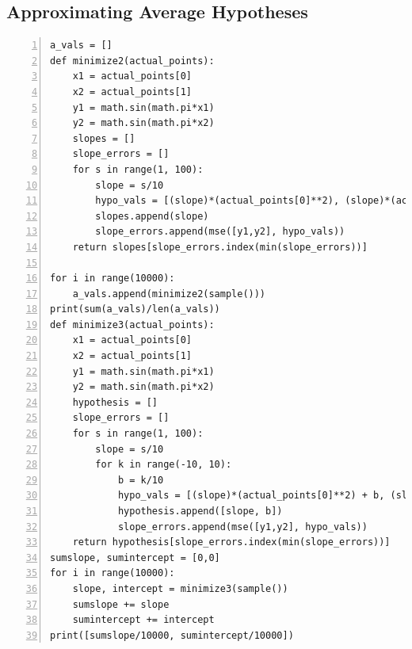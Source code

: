 \documentclass{article}
\begin{document}
\subsection{\label{prob7}Approximating Average Hypotheses}
\begin{lstlisting}[frame=single,
numbers=left,
style=Matlab-Pyglike]
a_vals = []
def minimize2(actual_points):
    x1 = actual_points[0]
    x2 = actual_points[1]
    y1 = math.sin(math.pi*x1)
    y2 = math.sin(math.pi*x2)
    slopes = []
    slope_errors = []
    for s in range(1, 100):
        slope = s/10
        hypo_vals = [(slope)*(actual_points[0]**2), (slope)*(actual_points[1]**2)]
        slopes.append(slope)
        slope_errors.append(mse([y1,y2], hypo_vals))
    return slopes[slope_errors.index(min(slope_errors))]

for i in range(10000):
    a_vals.append(minimize2(sample()))
print(sum(a_vals)/len(a_vals))
def minimize3(actual_points):
    x1 = actual_points[0]
    x2 = actual_points[1]
    y1 = math.sin(math.pi*x1)
    y2 = math.sin(math.pi*x2)
    hypothesis = []
    slope_errors = []
    for s in range(1, 100):
        slope = s/10
        for k in range(-10, 10):
            b = k/10
            hypo_vals = [(slope)*(actual_points[0]**2) + b, (slope)*(actual_points[1]**2) + b]
            hypothesis.append([slope, b])
            slope_errors.append(mse([y1,y2], hypo_vals))
    return hypothesis[slope_errors.index(min(slope_errors))]
sumslope, sumintercept = [0,0]
for i in range(10000):
    slope, intercept = minimize3(sample())
    sumslope += slope
    sumintercept += intercept
print([sumslope/10000, sumintercept/10000])
\end{lstlisting}
\end{document}
